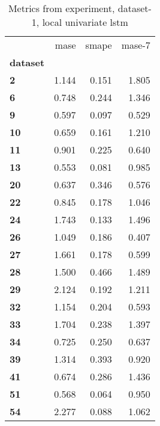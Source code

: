 \begin{table}[h]
\centering
\caption{Metrics from experiment, dataset-1, local univariate lstm}
\label{table:local-univariate-lstm-dataset-1}
\begin{tabular}{lrrr}
\toprule
{} &   mase &  smape &  mase-7 \\
\textbf{dataset} &        &        &         \\
\midrule
\textbf{2      } &  1.144 &  0.151 &   1.805 \\
\textbf{6      } &  0.748 &  0.244 &   1.346 \\
\textbf{9      } &  0.597 &  0.097 &   0.529 \\
\textbf{10     } &  0.659 &  0.161 &   1.210 \\
\textbf{11     } &  0.901 &  0.225 &   0.640 \\
\textbf{13     } &  0.553 &  0.081 &   0.985 \\
\textbf{20     } &  0.637 &  0.346 &   0.576 \\
\textbf{22     } &  0.845 &  0.178 &   1.046 \\
\textbf{24     } &  1.743 &  0.133 &   1.496 \\
\textbf{26     } &  1.049 &  0.186 &   0.407 \\
\textbf{27     } &  1.661 &  0.178 &   0.599 \\
\textbf{28     } &  1.500 &  0.466 &   1.489 \\
\textbf{29     } &  2.124 &  0.192 &   1.211 \\
\textbf{32     } &  1.154 &  0.204 &   0.593 \\
\textbf{33     } &  1.704 &  0.238 &   1.397 \\
\textbf{34     } &  0.725 &  0.250 &   0.637 \\
\textbf{39     } &  1.314 &  0.393 &   0.920 \\
\textbf{41     } &  0.674 &  0.286 &   1.436 \\
\textbf{51     } &  0.568 &  0.064 &   0.950 \\
\textbf{54     } &  2.277 &  0.088 &   1.062 \\
\bottomrule
\end{tabular}
\end{table}

